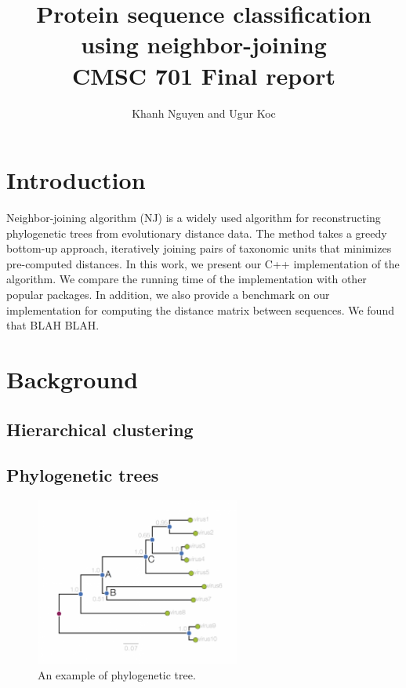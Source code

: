 \documentclass[11pt,letterpaper]{article}
\title{
Protein sequence classification using neighbor-joining\\
   CMSC 701 Final report
}
\author{
	Khanh Nguyen and Ugur Koc
}
\theoremstyle{definition}
\begin{document}
\maketitle

\section{Introduction}

Neighbor-joining algorithm (NJ) is a widely used algorithm for reconstructing phylogenetic trees from evolutionary distance data. The method takes a greedy bottom-up approach, iteratively joining pairs of taxonomic units that minimizes pre-computed distances. In this work, we present our C++ implementation of the algorithm. We compare the running time of the implementation with other popular packages. In addition, we also provide a benchmark on our implementation for computing the distance matrix between sequences. We found that BLAH BLAH.

\section{Background}

\subsection{Hierarchical clustering}

\subsection{Phylogenetic trees}

\begin{figure}[h]
  \centering
  \includegraphics[width=0.6\textwidth]{phylogram_1a.png}
  \caption{An example of phylogenetic tree.}
  \label{fig:phytree}
\end{figure}
\end{document}
